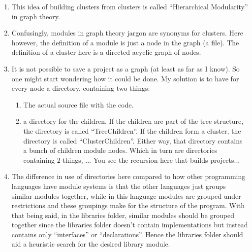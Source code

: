 \documentclass{article}
\begin{document}
\begin{enumerate}
    \item This idea of building clusters from clusters is called “Hierarchical Modularity” in graph theory.

    \item Confusingly, modules in graph theory jargon are synonyms for clusters. Here however, the definition of a module is just a node in the graph (a file). The definition of a cluster here is a directed acyclic graph of nodes.
    
    \item It is not possible to save a project as a graph (at least as far as I know). So one might start wondering how it could be done. My solution is to have for every node a directory, containing two things:
    
    \begin{enumerate}
        \item The actual source file with the code.

        \item a directory for the children. If the children are part of the tree structure, the directory is called “TreeChildren”. If the children form a cluster, the directory is called “ClusterChildren”. Either way, that directory contains a bunch of children module nodes. Which in turn are directories containing 2 things, ... You see the recursion here that builds projects...
    
    \end{enumerate}
    
    \item The difference in use of directories here compared to how other programming languages have module systems is that the other languages just groups similar modules together, while in this language modules are grouped under restrictions and these groupings make for the structure of the program. With that being said, in the libraries folder, similar modules should be grouped together since the libraries folder doesn’t contain implementations but instead contains only “interfaces” or “declarations”. Hence the libraries folder should aid a heuristic search for the desired library module.
    
\end{enumerate}


\end{document}
